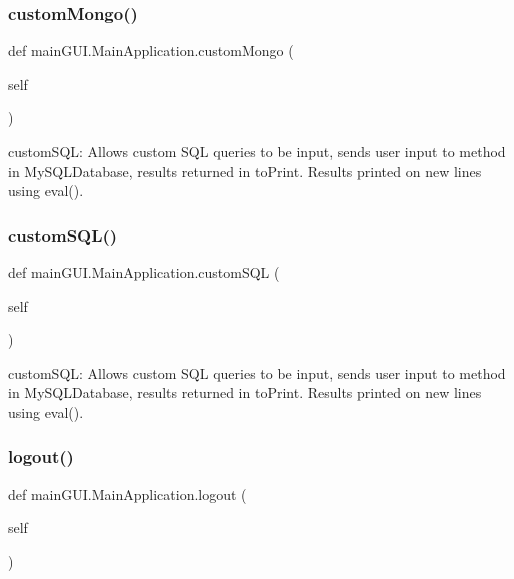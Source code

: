 \subsubsection{\texorpdfstring{custom\+Mongo()}{customMongo()}}
{\footnotesize\ttfamily def main\+G\+U\+I.\+Main\+Application.\+custom\+Mongo (\begin{DoxyParamCaption}\item[{}]{self }\end{DoxyParamCaption})}

\begin{DoxyVerb}customSQL: Allows custom SQL queries to be input, sends user input
    to method in MySQLDatabase, results returned in toPrint. Results
    printed on new lines using eval(). \end{DoxyVerb}
 \hypertarget{classmain_g_u_i_1_1_main_application_a47ac9da75d8ab9ecd89b3e7590ccf754}{}\label{classmain_g_u_i_1_1_main_application_a47ac9da75d8ab9ecd89b3e7590ccf754} 
\subsubsection{\texorpdfstring{custom\+S\+Q\+L()}{customSQL()}}
{\footnotesize\ttfamily def main\+G\+U\+I.\+Main\+Application.\+custom\+S\+QL (\begin{DoxyParamCaption}\item[{}]{self }\end{DoxyParamCaption})}

\begin{DoxyVerb}customSQL: Allows custom SQL queries to be input, sends user input
    to method in MySQLDatabase, results returned in toPrint. Results
    printed on new lines using eval(). \end{DoxyVerb}
 \hypertarget{classmain_g_u_i_1_1_main_application_af3fa9d6210d07607eb8161acd340eed0}{}\label{classmain_g_u_i_1_1_main_application_af3fa9d6210d07607eb8161acd340eed0} 
\subsubsection{\texorpdfstring{logout()}{logout()}}
{\footnotesize\ttfamily def main\+G\+U\+I.\+Main\+Application.\+logout (\begin{DoxyParamCaption}\item[{}]{self }\end{DoxyParamCaption})}

